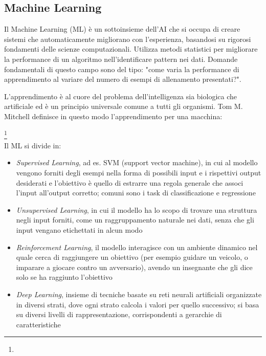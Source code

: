 \subsection{Machine Learning}

Il Machine Learning (ML) è un sottoinsieme dell'AI che si occupa di creare sistemi che automaticamente migliorano con l'esperienza, basandosi su rigorosi fondamenti delle scienze computazionali. Utilizza metodi statistici per migliorare la performance di un algoritmo nell'identificare pattern nei dati. Domande fondamentali di questo campo sono del tipo: "come varia la performance di apprendimento al variare del numero di esempi di allenamento presentati?". 

\par L'apprendimento è al cuore del problema dell'intelligenza sia biologica che artificiale ed è un principio universale comune a tutti gli organismi. Tom M. Mitchell definisce in questo modo l'apprendimento per una macchina:

\footnote{} \\

Il ML si divide in:

\begin{itemize}
	\item \textit{Supervised Learning}, ad es. SVM (support vector machine), in cui al modello vengono forniti degli esempi nella forma di possibili input e i rispettivi output desiderati e l'obiettivo è quello di estrarre una regola generale che associ l'input all'output corretto; comuni sono i task di classificazione e regressione \\
	
	\item \textit{Unsupervised Learning}, in cui il modello ha lo scopo di trovare una struttura negli input forniti, come un raggruppamento naturale nei dati, senza che gli input vengano etichettati in alcun modo \\
	
	\item \textit{Reinforcement Learning}, il modello interagisce con un ambiente dinamico nel quale cerca di raggiungere un obiettivo (per esempio guidare un veicolo, o imparare a giocare contro un avversario), avendo un insegnante che gli dice solo se ha raggiunto l'obiettivo \\
	
	\item \textit{Deep Learning}, insieme di tecniche basate su reti neurali artificiali organizzate in diversi strati, dove ogni strato calcola i valori per quello successivo; si basa su diversi livelli di rappresentazione, corrispondenti a gerarchie di caratteristiche
\end{itemize}

